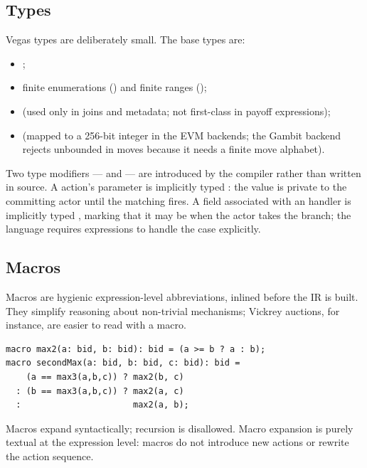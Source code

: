 \subsection{Types}

Vegas types are deliberately small.  The base types are:

\begin{itemize}\itemsep1pt
\item {};
\item finite enumerations () and
  finite ranges ();
\item {} (used only in joins and metadata; not first-class
  in payoff expressions);
\item {} (mapped to a 256-bit integer in the EVM backends; the
  Gambit backend rejects unbounded  in moves because it
  needs a finite move alphabet).
\end{itemize}

Two type modifiers ---  and  --- are
introduced by the compiler rather than written in source.  A
 action's parameter is implicitly typed
: the value is private to the committing actor
until the matching  fires.  A field associated with
an  handler is implicitly typed , marking
that it may be  when the actor takes the 
branch; the language requires  expressions to
handle the  case explicitly.

\subsection{Macros}

Macros are hygienic expression-level abbreviations, inlined before
the IR is built.  They simplify reasoning about non-trivial
mechanisms; Vickrey auctions, for instance, are easier to read
with a  macro.

\begin{lstlisting}[style=vg]
macro max2(a: bid, b: bid): bid = (a >= b ? a : b);
macro secondMax(a: bid, b: bid, c: bid): bid =
    (a == max3(a,b,c)) ? max2(b, c)
  : (b == max3(a,b,c)) ? max2(a, c)
  :                      max2(a, b);
\end{lstlisting}

Macros expand syntactically; recursion is disallowed.  Macro
expansion is purely textual at the expression level: macros do
not introduce new actions or rewrite the action sequence.

